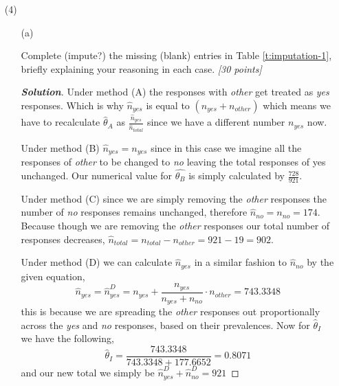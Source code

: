 \documentclass[12pt]{article}
\newenvironment{solution}{\begin{proof}[\textbf{\textit{Solution}}] }{\end{proof}}
\begin{document}
\begin{itemize}
\begin{table}[t!]
\begin{tabular}{c||ccccc||cc}
\end{tabular}

\end{table}
\item[(4)]

\begin{itemize}

\item[(a)]

Complete (impute?) the missing (blank) entries in Table \ref{t:imputation-1}, briefly explaining your reasoning in each case. \textit{[30 points]}

\begin{tcolorbox}
    \begin{solution}
         Under method (A) the responses with \textit{other} get treated as \textit{yes} responses. Which is why $\hat{n}_{yes}$ is equal to $(n_{yes} + n_{other})$ which means we have to recalculate $\hat{\theta}_{A}$ as $\frac{\hat{n}_{yes}}{\hat{n}_{total}}$ since we have a different number $n_{yes}$ now. 
        
         Under method (B) $\hat{n}_{yes} = n_{yes}$ since in this case we imagine all the responses of \textit{other} to be changed to \textit{no} leaving the total responses of yes unchanged. Our numerical value for $\hat{\theta_B}$ is simply calculated by $\frac{728}{921}$.
         
         Under method (C) since we are simply removing the \textit{other} responses the number of \textit{no} responses remains unchanged, therefore $\hat{n}_{no} = n_{no}  = 174$. Because though we are removing the \textit{other} responses our total number of responses decreases, $\hat{n}_{total} = n_{total} - n_{other} = 921 - 19 = 902$. 

         Under method (D) we can calculate $\hat{n}_{yes}$ in a similar fashion to $\hat{n}_{no}$ by the given equation,
         \[\hat{n}_{yes} = \hat{n}_{yes}^{D} = n_{yes} + \frac{n_{yes}}{n_{yes} + n_{no}} \cdot n_{other} = 743.3348 \]
        this is because we are spreading the \textit{other} responses out proportionally across the \textit{yes} and \textit{no} responses, based on their prevalences. 
        Now for $\hat{\theta}_I$ we have the following,
        \[\hat{\theta}_I = \frac{743.3348}{743.3348 + 177.6652} = 0.8071 \]
        and our new total we simply be $\hat{n}_{yes}^{D} + \hat{n}_{no}^{D} = 921$
    \end{solution}
\end{tcolorbox}
\vspace*{1.0in}


\end{itemize}
\end{itemize}
\end{document}
